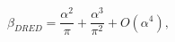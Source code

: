 \begin{equation}\label{Beta_DRED}
\beta_{DRED} = \frac{\alpha^2}{\pi} + \frac{\alpha^3}{\pi^2} + O(\alpha^4),
\end{equation}

